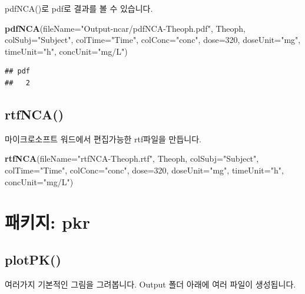 \documentclass[12pt,]{krantz}
\newenvironment{Shaded}{\begin{snugshade}}{\end{snugshade}}
\newcommand{\KeywordTok}[1]{\textcolor[rgb]{0.13,0.29,0.53}{\textbf{#1}}}
\newcommand{\DataTypeTok}[1]{\textcolor[rgb]{0.13,0.29,0.53}{#1}}
\newcommand{\DecValTok}[1]{\textcolor[rgb]{0.00,0.00,0.81}{#1}}
\newcommand{\StringTok}[1]{\textcolor[rgb]{0.31,0.60,0.02}{#1}}
\newcommand{\NormalTok}[1]{#1}
\begin{document}
pdfNCA()로 pdf로 결과를 볼 수 있습니다.

\begin{Shaded}
\begin{Highlighting}[]
\KeywordTok{pdfNCA}\NormalTok{(}\DataTypeTok{fileName=}\StringTok{"Output-ncar/pdfNCA-Theoph.pdf"}\NormalTok{, Theoph, }\DataTypeTok{colSubj=}\StringTok{"Subject"}\NormalTok{, }\DataTypeTok{colTime=}\StringTok{"Time"}\NormalTok{, }
       \DataTypeTok{colConc=}\StringTok{"conc"}\NormalTok{, }\DataTypeTok{dose=}\DecValTok{320}\NormalTok{, }\DataTypeTok{doseUnit=}\StringTok{"mg"}\NormalTok{, }\DataTypeTok{timeUnit=}\StringTok{"h"}\NormalTok{, }\DataTypeTok{concUnit=}\StringTok{"mg/L"}\NormalTok{)}
\end{Highlighting}
\end{Shaded}

\begin{verbatim}
## pdf 
##   2
\end{verbatim}

\section{rtfNCA()}\label{rtfnca}

마이크로소프트 워드에서 편집가능한 rtf파일을 만듭니다.

\begin{Shaded}
\begin{Highlighting}[]
\KeywordTok{rtfNCA}\NormalTok{(}\DataTypeTok{fileName=}\StringTok{"rtfNCA-Theoph.rtf"}\NormalTok{, Theoph, }\DataTypeTok{colSubj=}\StringTok{"Subject"}\NormalTok{, }\DataTypeTok{colTime=}\StringTok{"Time"}\NormalTok{, }
       \DataTypeTok{colConc=}\StringTok{"conc"}\NormalTok{, }\DataTypeTok{dose=}\DecValTok{320}\NormalTok{, }\DataTypeTok{doseUnit=}\StringTok{"mg"}\NormalTok{, }\DataTypeTok{timeUnit=}\StringTok{"h"}\NormalTok{, }\DataTypeTok{concUnit=}\StringTok{"mg/L"}\NormalTok{)}
\end{Highlighting}
\end{Shaded}

\chapter{패키지: pkr}\label{-pkr}

\section{plotPK()}\label{plotpk}

여러가지 기본적인 그림을 그려봅니다. Output 폴더 아래에 여러 파일이
생성됩니다.
\end{document}
